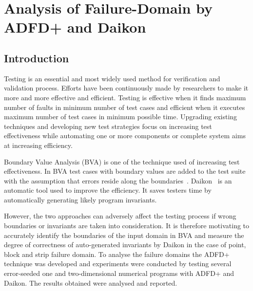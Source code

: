 \chapter{Analysis of Failure-Domain by ADFD+ and Daikon}
\label{chap:ADFD+}

\section{Introduction}\label{sec:intro6}
Testing is an essential and most widely used method for verification and validation process. Efforts have been continuously made by researchers to make it more and more effective and efficient. Testing is effective when it finds maximum number of faults in minimum number of test cases and efficient when it executes maximum number of test cases in minimum possible time. Upgrading existing techniques and developing new test strategies focus on increasing test effectiveness while automating one or more components or complete system aims at increasing efficiency.

Boundary Value Analysis (BVA) is one of the technique used of increasing test effectiveness. In BVA test cases with boundary values are added to the test suite with the assumption that errors reside along the boundaries~\cite{radatz1990ieee}. Daikon~\cite{ernst2007daikon} is an automatic tool used to improve the efficiency. It saves testers time by automatically generating likely program invariants.

However, the two approaches can adversely affect the testing process if wrong boundaries or invariants are taken into consideration. It is therefore motivating to accurately identify the boundaries of the input domain in BVA and measure the degree of correctness of auto-generated invariants by Daikon in the case of point, block and strip failure domain. To analyse the failure domains the ADFD+ technique was developed and experiments were conducted by testing several error-seeded one and two-dimensional numerical programs with ADFD+ and Daikon. The results obtained were analysed and reported.  

